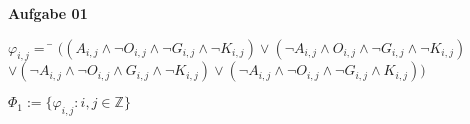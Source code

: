 \documentclass[a4paper,10pt]{article}
\begin{document}
	\parindent0pt
	\textbf{Aufgabe 01} \\
	\begin{compactenum} [(a)]
		\item
		\begin{compactitem}
			\item
			\begin{tabbing}
				$ \varphi_{i,j} = $ 
				\= $ ((A_{i,j}\wedge \lnot O_{i,j} \wedge \lnot G_{i,j}\wedge \lnot K_{i,j})\vee(\lnot A_{i,j}\wedge O_{i,j}\wedge\lnot G_{i,j}\wedge \lnot K_{i,j}) $ \\
				\> $ \vee ( \lnot A_{i,j}\wedge \lnot O_{i,j}\wedge G_{i,j}\wedge \lnot K_{i,j})\vee( \lnot A_{i,j}\wedge \lnot O_{i,j}\wedge \lnot G_{i,j}\wedge K_{i,j}))$
			\end{tabbing}
			$ \varPhi_1 := \{\varphi_{i,j} : i,j \in \mathbb{Z}\} $
			

\end{compactitem}
\end{compactenum}
\end{document}
